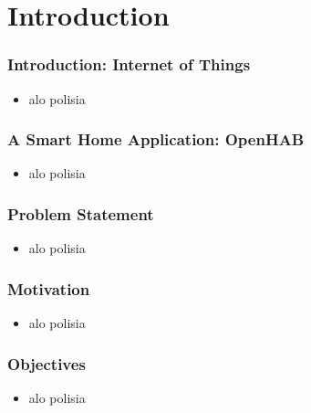 \documentclass{beamer}
\begin{document}
\section{Introduction} %
\begin{frame}
\frametitle{Introduction: Internet of Things}
\begin{itemize}
  \setlength\itemsep{1.5em}
\item alo polisia
\end{itemize}
\end{frame}
\begin{frame}
\frametitle{A Smart Home Application: OpenHAB}
\begin{itemize}
  \setlength\itemsep{1.5em}
\item alo polisia
\end{itemize}
\end{frame}
\begin{frame}
\frametitle{Problem Statement}
\begin{itemize}
  \setlength\itemsep{1.5em}
\item alo polisia
\end{itemize}
\end{frame}
\begin{frame}
\frametitle{Motivation}
\begin{itemize}
  \setlength\itemsep{1.5em}
\item alo polisia
\end{itemize}
\end{frame}
\begin{frame}
\frametitle{Objectives} %
\begin{itemize}
  \setlength\itemsep{1.5em}
\item alo polisia
\end{itemize}
\end{frame}
\end{document}
